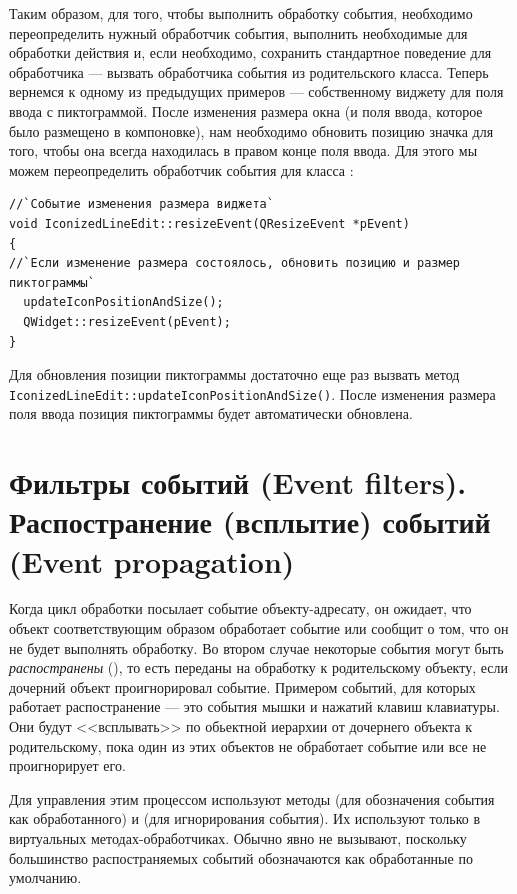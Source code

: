 Таким образом, для того, чтобы выполнить обработку события, необходимо переопределить нужный обработчик события,
выполнить необходимые для обработки действия и, если необходимо, сохранить стандартное поведение для обработчика ---
вызвать обработчика события из родительского класса. Теперь вернемся к одному из предыдущих примеров --- собственному
виджету для поля ввода с пиктограммой. После изменения размера окна (и поля ввода, которое было размещено в
компоновке), нам необходимо обновить позицию значка для того, чтобы она всегда находилась в правом конце поля ввода.
Для этого мы можем переопределить обработчик события  для класса :
\begin{lstlisting}
//`Событие изменения размера виджета`
void IconizedLineEdit::resizeEvent(QResizeEvent *pEvent)
{
//`Если изменение размера состоялось, обновить позицию и размер пиктограммы`
  updateIconPositionAndSize();
  QWidget::resizeEvent(pEvent);
}
\end{lstlisting}

Для обновления позиции пиктограммы достаточно еще раз вызвать метод
\lstinline!IconizedLineEdit::updateIconPositionAndSize()!. После изменения размера поля ввода позиция пиктограммы будет
автоматически обновлена.

\section[Фильтры событий (Event filters)]{Фильтры событий (Event filters). Распостранение (всплытие) событий (Event propagation)}
Когда цикл обработки посылает событие объекту-адресату, он ожидает, что объект соответствующим образом обработает
событие или сообщит о том, что он не будет выполнять обработку. 
Во втором случае некоторые события могут быть \emph{распостранены} (), то есть переданы на обработку к родительскому объекту, если дочерний объект проигнорировал событие.
Примером событий, для которых работает распостранение --- это
события мышки и нажатий клавиш клавиатуры. Они будут <<всплывать>> по обьектной иерархии от дочернего объекта к родительскому, пока один из этих объектов не обработает событие или все не проигнорирует его. 

Для управления этим процессом используют методы 
(для обозначения события как обработанного) и  (для игнорирования события). Их
используют только в виртуальных методах-обработчиках. Обычно  явно не вызывают,
поскольку большинство распостраняемых событий обозначаются как обработанные по умолчанию.

